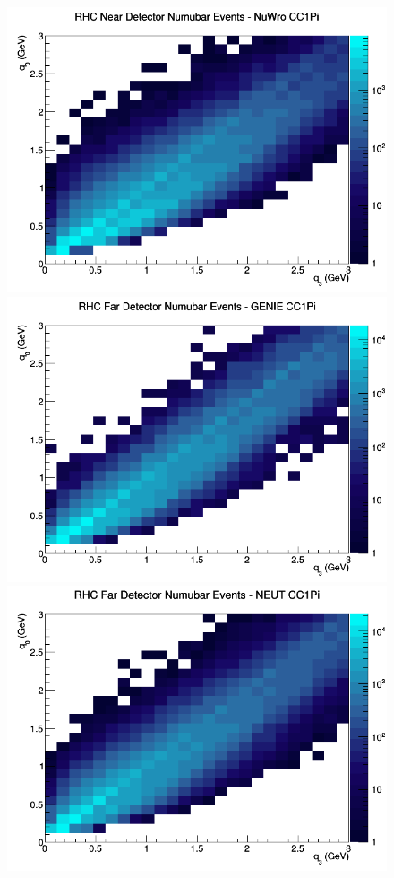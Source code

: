\begin{figure}[h]
\includegraphics[width=\linewidth]{eff_q0_q3/FGT/CC1Pi_RHC_ND_numubar_q3_q0_NuWro.png}
\endminipage
\newline
{}
\includegraphics[width=\linewidth]{eff_q0_q3/FGT/CC1Pi_RHC_FD_numubar_q3_q0_GENIE.png}
\endminipage
{}
\includegraphics[width=\linewidth]{eff_q0_q3/FGT/CC1Pi_RHC_FD_numubar_q3_q0_NEUT.png}

\end{figure}
